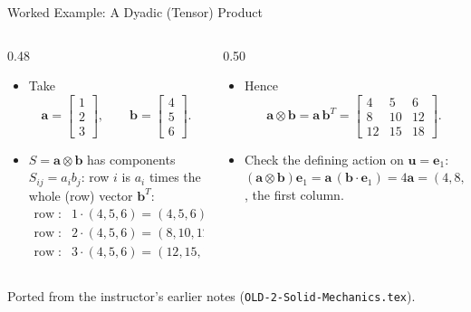 \documentclass[aspectratio=169,11pt]{beamer}
\begin{document}
\begin{frame}{Worked Example: A Dyadic (Tensor) Product}
\begin{columns}[T,onlytextwidth]
\begin{column}{0.48\textwidth}
\begin{itemize}
\item Take
\[
\mathbf{a} = \begin{bmatrix} 1 \\ 2 \\ 3 \end{bmatrix}, \qquad
\mathbf{b} = \begin{bmatrix} 4 \\ 5 \\ 6 \end{bmatrix}.
\]
\item $S=\mathbf{a}\otimes\mathbf{b}$ has components $S_{ij}=a_i b_j$: row $i$ is $a_i$ times the whole (row) vector $\mathbf{b}^T$:
\[
\begin{aligned}
\text{row 1}: &\; 1\cdot(4,5,6) = (4,5,6)\\
\text{row 2}: &\; 2\cdot(4,5,6) = (8,10,12)\\
\text{row 3}: &\; 3\cdot(4,5,6) = (12,15,18)
\end{aligned}
\]
\end{itemize}
\end{column}
\begin{column}{0.50\textwidth}
\begin{itemize}
\item Hence
\[
\mathbf{a}\otimes\mathbf{b} = \mathbf{a}\,\mathbf{b}^T =
\begin{bmatrix} 4 & 5 & 6 \\ 8 & 10 & 12 \\ 12 & 15 & 18 \end{bmatrix}.
\]
\item Check the defining action on $\mathbf{u}=\mathbf{e}_1$: $(\mathbf{a}\otimes\mathbf{b})\mathbf{e}_1 = \mathbf{a}\,(\mathbf{b}\cdot\mathbf{e}_1) = 4\mathbf{a} = (4,8,12)^T$, the first column. \checkmark
\end{itemize}
\end{column}
\end{columns}
\vspace{1mm}
{\tiny\color{DarkGray}Ported from the instructor's earlier notes (\texttt{OLD-2-Solid-Mechanics.tex}).\par}
\end{frame}
\end{document}
